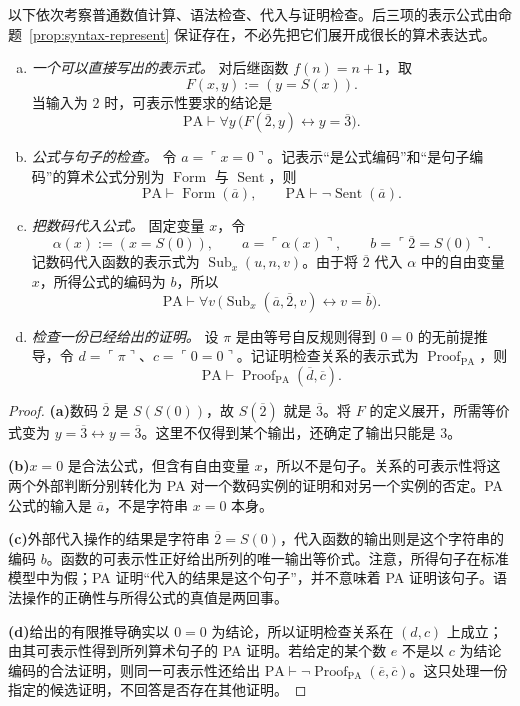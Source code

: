 \documentclass[lang=cn,a4paper,fontset=none,zihao=false,10pt,openany,twoside]{beautybook}
\numberwithin{algorithm}{chapter}
\begin{document}
\begin{example}[可表示性给出了什么]
以下依次考察普通数值计算、语法检查、代入与证明检查。后三项的表示公式由命题~\ref{prop:syntax-represent} 保证存在，不必先把它们展开成很长的算术表达式。
\begin{enumerate}[(a)]
\item \emph{一个可以直接写出的表示式。} 对后继函数 $f(n)=n+1$，取
\[
 F(x,y):=(y=S(x)).
\]
当输入为 $2$ 时，可表示性要求的结论是
\[
 \mathrm{PA}\vdash\forall y\,
 \bigl(F(\overline2,y)\leftrightarrow y=\overline3\bigr).
\]
\item \emph{公式与句子的检查。} 令 $a=\ulcorner x=0\urcorner$。记表示“是公式编码”和“是句子编码”的算术公式分别为 $\operatorname{Form}$ 与 $\operatorname{Sent}$，则
\[
 \mathrm{PA}\vdash\operatorname{Form}(\overline a),
 \qquad
 \mathrm{PA}\vdash\neg\operatorname{Sent}(\overline a).
\]
\item \emph{把数码代入公式。} 固定变量 $x$，令
\[
 \alpha(x):=(x=S(0)),\qquad
 a=\ulcorner\alpha(x)\urcorner,\qquad
 b=\ulcorner\overline2=S(0)\urcorner.
\]
记数码代入函数的表示式为 $\operatorname{Sub}_x(u,n,v)$。由于将 $\overline2$ 代入 $\alpha$ 中的自由变量 $x$，所得公式的编码为 $b$，所以
\[
 \mathrm{PA}\vdash\forall v\,
 \bigl(\operatorname{Sub}_x(\overline a,\overline2,v)
 \leftrightarrow v=\overline b\bigr).
\]
\item \emph{检查一份已经给出的证明。} 设 $\pi$ 是由等号自反规则得到 $0=0$ 的无前提推导，令 $d=\ulcorner\pi\urcorner$、$c=\ulcorner0=0\urcorner$。记证明检查关系的表示式为 $\operatorname{Proof}_{\mathrm{PA}}$，则
\[
 \mathrm{PA}\vdash
 \operatorname{Proof}_{\mathrm{PA}}(\overline d,\overline c).
\]
\end{enumerate}
\end{example}
\begin{proof}
\par\smallskip\noindent\textbf{(a)}\quad 数码 $\overline2$ 是 $S(S(0))$，故 $S(\overline2)$ 就是 $\overline3$。将 $F$ 的定义展开，所需等价式变为 $y=\overline3\leftrightarrow y=\overline3$。这里不仅得到某个输出，还确定了输出只能是 $3$。

\par\smallskip\noindent\textbf{(b)}\quad $x=0$ 是合法公式，但含有自由变量 $x$，所以不是句子。关系的可表示性将这两个外部判断分别转化为 PA 对一个数码实例的证明和对另一个实例的否定。PA 公式的输入是 $\overline a$，不是字符串 $x=0$ 本身。

\par\smallskip\noindent\textbf{(c)}\quad 外部代入操作的结果是字符串 $\overline2=S(0)$，代入函数的输出则是这个字符串的编码 $b$。函数的可表示性正好给出所列的唯一输出等价式。注意，所得句子在标准模型中为假；PA 证明“代入的结果是这个句子”，并不意味着 PA 证明该句子。语法操作的正确性与所得公式的真值是两回事。

\par\smallskip\noindent\textbf{(d)}\quad 给出的有限推导确实以 $0=0$ 为结论，所以证明检查关系在 $(d,c)$ 上成立；由其可表示性得到所列算术句子的 PA 证明。若给定的某个数 $e$ 不是以 $c$ 为结论编码的合法证明，则同一可表示性还给出 $\mathrm{PA}\vdash\neg\operatorname{Proof}_{\mathrm{PA}}(\overline e,\overline c)$。这只处理一份指定的候选证明，不回答是否存在其他证明。
\end{proof}
\end{document}
